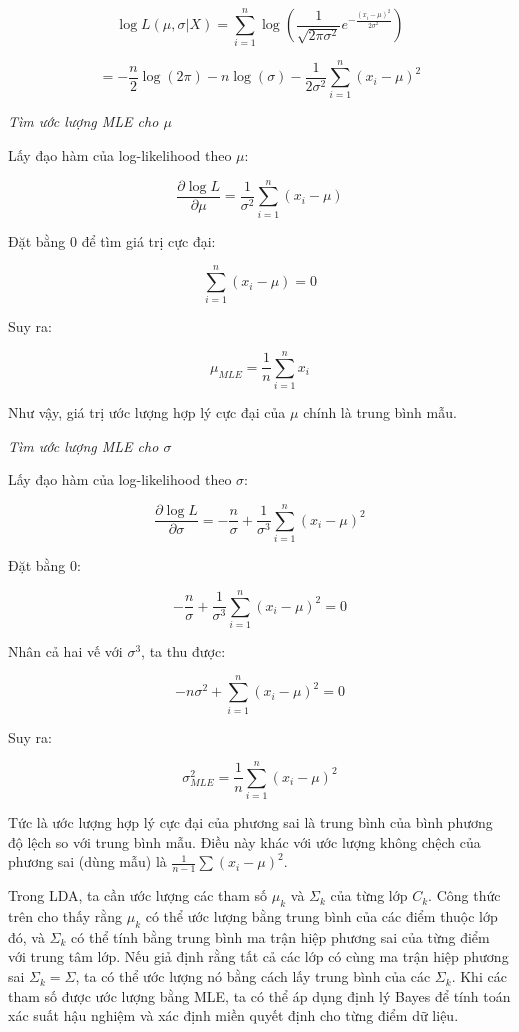 \[
\log L(\mu, \sigma | X) = \sum_{i=1}^{n} \log \left( \frac{1}{\sqrt{2\pi\sigma^2}} e^{-\frac{(x_i - \mu)^2}{2\sigma^2}} \right)
\]

\begin{equation}
= -\frac{n}{2} \log(2\pi) - n \log(\sigma) - \frac{1}{2\sigma^2} \sum_{i=1}^{n} (x_i - \mu)^2
\tag{2.2.7}
\end{equation}

\textit{Tìm ước lượng MLE cho \( \mu \)}  

Lấy đạo hàm của log-likelihood theo \( \mu \):

\[
\frac{\partial \log L}{\partial \mu} = \frac{1}{\sigma^2} \sum_{i=1}^{n} (x_i - \mu)
\]

Đặt bằng 0 để tìm giá trị cực đại:

\[
\sum_{i=1}^{n} (x_i - \mu) = 0
\]

Suy ra:

\begin{equation}
\mu_{MLE} = \frac{1}{n} \sum_{i=1}^{n} x_i
\tag{2.2.8}
\end{equation}

Như vậy, giá trị ước lượng hợp lý cực đại của \( \mu \) chính là trung bình mẫu.

\textit{Tìm ước lượng MLE cho \( \sigma \)}  

Lấy đạo hàm của log-likelihood theo \( \sigma \):

\[
\frac{\partial \log L}{\partial \sigma} = -\frac{n}{\sigma} + \frac{1}{\sigma^3} \sum_{i=1}^{n} (x_i - \mu)^2
\]

Đặt bằng 0:

\[
-\frac{n}{\sigma} + \frac{1}{\sigma^3} \sum_{i=1}^{n} (x_i - \mu)^2 = 0
\]

Nhân cả hai vế với \( \sigma^3 \), ta thu được:

\[
-n\sigma^2 + \sum_{i=1}^{n} (x_i - \mu)^2 = 0
\]

Suy ra:

\begin{equation}
\sigma^2_{MLE} = \frac{1}{n} \sum_{i=1}^{n} (x_i - \mu)^2
\tag{2.2.9}
\end{equation}

Tức là ước lượng hợp lý cực đại của phương sai là trung bình của bình phương độ lệch so với trung bình mẫu. Điều này khác với ước lượng không chệch của phương sai (dùng mẫu) là \( \frac{1}{n-1} \sum (x_i - \mu)^2 \).
 
Trong LDA, ta cần ước lượng các tham số \( \mu_k \) và \( \Sigma_k \) của từng lớp \( C_k \). Công thức trên cho thấy rằng \( \mu_k \) có thể ước lượng bằng trung bình của các điểm thuộc lớp đó, và \( \Sigma_k \) có thể tính bằng trung bình ma trận hiệp phương sai của từng điểm với trung tâm lớp. Nếu giả định rằng tất cả các lớp có cùng ma trận hiệp phương sai \( \Sigma_k = \Sigma \), ta có thể ước lượng nó bằng cách lấy trung bình của các \( \Sigma_k \). Khi các tham số được ước lượng bằng MLE, ta có thể áp dụng định lý Bayes để tính toán xác suất hậu nghiệm và xác định miền quyết định cho từng điểm dữ liệu.  


